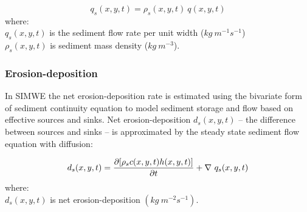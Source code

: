 \documentclass[esurf, manuscript]{copernicus}
\begin{document}
\begin{equation}\label{eq:sedflow} 
q_s(x,y,t) = \rho_s(x,y,t) ~ q(x,y,t)
\end{equation}
%
{\small
\noindent
where: \\
\hspace*{0.5em} $q_s(x,y,t)$ is the sediment flow rate per unit width ($kg~m^{-1}s^{-1}$)\\
\hspace*{0.5em} $\rho_s(x,y,t)$ is sediment mass density ($kg~m^{-3}$).\\
}

\subsubsection{Erosion-deposition}
In SIMWE 
the net erosion-deposition rate is estimated
using the bivariate form of sediment continuity equation
to model sediment storage and flow 
based on effective sources and sinks.
Net erosion-deposition $d_s(x,y,t)$
-- the difference between sources and sinks --
is approximated by
the steady state sediment flow equation with diffusion:

\begin{equation}\label{eq:sediment} 
d_s(x,y,t) = 
{\partial [\rho_sc(x,y,t)h(x,y,t)] \over \partial t} +
\nabla ~ q_s(x,y,t)
\end{equation}
%
{\small
\noindent
where: \\
\hspace*{0.5em} $d_s(x,y,t)$ is net erosion-deposition $(kg ~ m^{-2} s^{-1})$.\\
}

\end{document}
